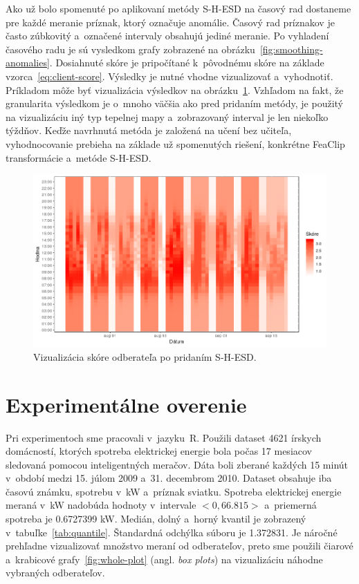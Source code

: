 \documentclass[a4paper,twoside,slovak,12pt,appendix]{article}
\begin{document}
Ako už bolo spomenuté po aplikovaní metódy S-H-ESD na časový rad dostaneme pre
každé meranie príznak, ktorý označuje anomálie. Časový rad príznakov je často
zúbkovitý a~označené intervaly obsahujú jediné meranie. Po vyhladení časového
radu je sú vysledkom grafy zobrazené na obrázku~\ref{fig:smoothing-anomalies}.
Dosiahnuté skóre je pripočítané k~pôvodnému skóre na základe
vzorca~\ref{eq:client-score}. Výsledky je nutné vhodne vizualizovať
a~vyhodnotiť. Príkladom môže byť vizualizácia výsledkov na
obrázku~\ref{fig:heatmap-hours}. Vzhľadom na fakt, že granularita výsledkom je
o~mnoho väčšia ako pred pridaním metódy, je použitý na vizualizáciu iný typ
tepelnej mapy a~zobrazovaný interval je len niekoľko týždňov. Keďže navrhnutá
metóda je založená na učení bez učiteľa, vyhodnocovanie prebieha na základe už
spomenutých riešení, konkrétne FeaClip transformácie a~metóde S-H-ESD.

\begin{figure}[htbp]
  \centering
  \includegraphics[width=\textwidth]{heatmap_hours.png}
  \caption{Vizualizácia skóre odberateľa po pridaním S-H-ESD.}
  \label{fig:heatmap-hours}
\end{figure}

\newpage\null\thispagestyle{empty}\newpage


\newpage
\section{Experimentálne overenie}
\label{c:experimental-verification}
Pri experimentoch sme pracovali v~jazyku~R. Použili dataset 4621 írskych
domácností, ktorých spotreba elektrickej energie bola počas 17 mesiacov
sledovaná pomocou inteligentných meračov. Dáta boli zberané každých 15 minút
v~období medzi 15. júlom 2009 a~31. decembrom 2010. Dataset obsahuje iba časovú
známku, spotrebu v~kW a~príznak sviatku. Spotreba elektrickej energie meraná
v~kW nadobúda hodnoty v~intervale $<0, 66.815>$ a~priemerná spotreba je
0.6727399 kW. Medián, dolný a~horný kvantil je zobrazený
v~tabuľke~\ref{tab:quantile}. Štandardná odchýlka súboru je 1.372831. Je náročné
prehľadne vizualizovať množstvo meraní od odberateľov, preto sme použili čiarové
a~krabicové grafy~\ref{fig:whole-plot} (angl. \textit{box plots}) na
vizualizáciu náhodne vybraných odberateľov.
\end{document}

